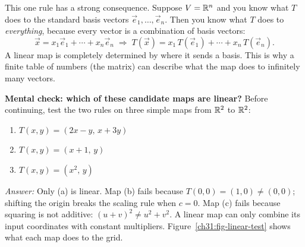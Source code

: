 This one rule has a strong consequence.
Suppose $V=\mathbb{R}^n$ and you know what $T$ does to
the standard basis vectors $\vec{e}_1,\dots,\vec{e}_n$. Then you know what $T$
does to \emph{everything}, because every vector is a combination of basis
vectors:
\[
  \vec{x} = x_1\vec{e}_1 + \cdots + x_n\vec{e}_n
  \;\Longrightarrow\;
  T(\vec{x}) = x_1\,T(\vec{e}_1) + \cdots + x_n\,T(\vec{e}_n).
\]
A linear map is completely determined by where it sends a basis. This is why a
finite table of numbers (the matrix) can describe what the map does to
infinitely many vectors.

\begin{recoverybox}
\textbf{Mental check: which of these candidate maps are linear?}
Before continuing, test the two rules on three simple maps from $\mathbb{R}^2$ to $\mathbb{R}^2$:
\begin{enumerate}[label=(\alph*)]
  \item $T(x,y) = (2x - y,\, x + 3y)$
  \item $T(x,y) = (x + 1,\, y)$
  \item $T(x,y) = (x^2,\, y)$
\end{enumerate}
\emph{Answer:} Only (a) is linear. Map (b) fails because $T(0,0) = (1,0) \neq (0,0)$; shifting the origin breaks the scaling rule when $c=0$. Map (c) fails because squaring is not additive: $(u+v)^2 \neq u^2 + v^2$. A linear map can only combine its input coordinates with constant multipliers. Figure~\ref{ch31:fig-linear-test} shows what each map does to the grid.
\end{recoverybox}

